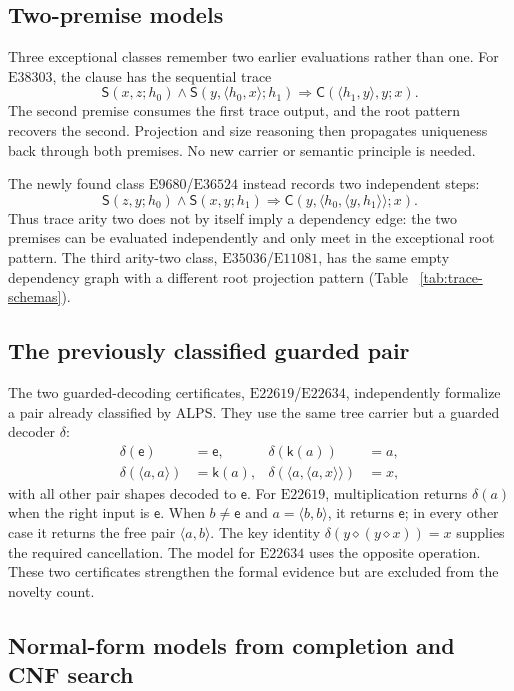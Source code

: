 \documentclass[runningheads]{llncs}
\newcommand{\Law}[1]{\ensuremath{\mathrm{E}#1}}
\newcommand{\op}{\mathbin{\diamond}}
\newcommand{\Code}{\mathsf{C}}
\newcommand{\Step}{\mathsf{S}}
\newcommand{\pair}[2]{\langle #1,#2\rangle}
\begin{document}
\subsection{Two-premise models}

Three exceptional classes remember two earlier evaluations rather than one.
For \Law{38303}, the clause has the sequential trace
\[
 \Step(x,z;h_0)\wedge
 \Step(y,\pair{h_0}{x};h_1)
 \Longrightarrow \Code(\pair{h_1}{y},y;x).
\]
The second premise consumes the first trace output, and the root pattern
recovers the second.  Projection and size reasoning then propagates uniqueness
back through both premises.  No new carrier or semantic principle is needed.

The newly found class \Law{9680}/\Law{36524} instead records two independent
steps:
\[
 \Step(z,y;h_0)\wedge \Step(x,y;h_1)
 \Longrightarrow \Code(y,\pair{h_0}{\pair{y}{h_1}};x).
\]
Thus trace arity two does not by itself imply a dependency edge: the two
premises can be evaluated independently and only meet in the exceptional root
pattern.  The third arity-two class, \Law{35036}/\Law{11081}, has the same
empty dependency graph with a different root projection pattern (Table
~\ref{tab:trace-schemas}).

\subsection{The previously classified guarded pair}
\label{sec:guarded-model}

The two guarded-decoding certificates, \Law{22619}/\Law{22634}, independently
formalize a pair already classified by ALPS.  They use the same tree carrier
but a guarded decoder $\delta$:
\[
\begin{aligned}
 \delta(\mathsf e)&=\mathsf e,&
 \delta(\mathsf k(a))&=a,\\
 \delta(\pair{a}{a})&=\mathsf k(a),&
 \delta(\pair{a}{\pair{a}{x}})&=x,
\end{aligned}
\]
with all other pair shapes decoded to $\mathsf e$.  For \Law{22619},
multiplication returns $\delta(a)$ when the right input is $\mathsf e$.  When
$b\ne\mathsf e$ and
$a=\pair{b}{b}$, it returns $\mathsf e$; in every other case it returns the
free pair $\pair{a}{b}$.  The key identity
$\delta(y\op(y\op x))=x$ supplies the required cancellation.  The model for
\Law{22634} uses the opposite operation.  These two certificates strengthen
the formal evidence but are excluded from the novelty count.

\subsection{Normal-form models from completion and CNF search}
\label{sec:normal-form}
\end{document}

